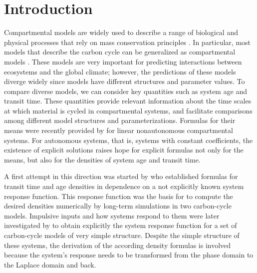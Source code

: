 \documentclass[smallextended]{svjour3}
\begin{document}
\section{Introduction}\label{intro}
Compartmental models are widely used to describe a range of biological and physical processes that rely on mass conservation principles \citep{Anderson1983, Jacquez1993SIAM}.
In particular, most models that describe the carbon cycle can be generalized as compartmental models \citep{Luo2011TEE, Sierra2015EM, Rasmussen2016JMB}.
These models are very important for predicting interactions between ecosystems and the global climate;
however, the predictions of these models diverge widely \citep{Friedlingstein2006JC, Friedlingstein2013JC} since models have different structures and parameter values.
To compare diverse models, we can consider key quantities such as system age and transit time.
These quantities provide relevant information about the time scales at which material is cycled in compartmental systems, and facilitate comparisons among different model structures and parameterizations.
Formulas for their means were recently provided by \citet{Rasmussen2016JMB} for linear nonautonomous compartmental systems.
For autonomous systems, that is, systems with constant coefficients, the existence of explicit solutions raises hope for explicit formulas not only for the means, but also for the densities of system age and transit time.

A first attempt in this direction was started by \citet{Nir1975Tellus} who established formulas for transit time and age densities in dependence on a not explicitly known system response function.
This response function was the basis for \citet{Thompson1999GCB} to compute the desired densities numerically by long-term simulations in two carbon-cycle models.
Impulsive inputs and how systems respond to them were later investigated by \citet{Manzoni2009JGR} to obtain explicitly the system response function for a set of carbon-cycle models of very simple structure.
Despite the simple structure of these systems, the derivation of the according density formulas is involved because the system's response needs to be transformed from the phase domain to the Laplace domain and back.
\end{document}
